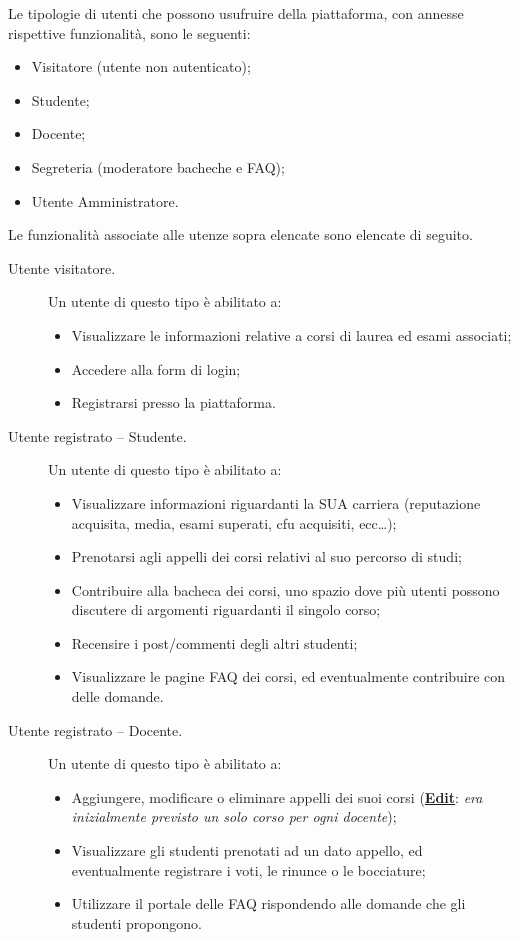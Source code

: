 \documentclass [a4paper,11pt]{book}
\begin{document}
Le tipologie di utenti che possono usufruire della piattaforma, con annesse rispettive funzionalità, sono le seguenti:
\begin{itemize}
\item Visitatore (utente non autenticato);
\item Studente;
\item Docente;
\item Segreteria (moderatore bacheche e FAQ);
\item Utente Amministratore.
\end{itemize}

\medskip
\medskip
\medskip

Le funzionalità associate alle utenze sopra elencate sono elencate di seguito.
\begin{description}
\item[Utente visitatore.] Un utente di questo tipo è abilitato a:

\begin{itemize}
\item Visualizzare le informazioni relative a corsi di laurea ed esami associati;
\item Accedere alla form di login;
\item Registrarsi presso la piattaforma.
\end{itemize}

\item[Utente registrato – Studente.] Un utente di questo tipo è abilitato a:

\begin{itemize}
\item Visualizzare informazioni riguardanti la SUA carriera (reputazione acquisita, media, esami superati, cfu acquisiti, ecc…);
\item Prenotarsi agli appelli dei corsi relativi al suo percorso di studi;
\item Contribuire alla bacheca dei corsi, uno spazio dove più utenti possono discutere di argomenti riguardanti il singolo corso;
\item Recensire i post/commenti degli altri studenti;
\item Visualizzare le pagine FAQ dei corsi, ed eventualmente contribuire con delle domande.
\end{itemize}

\item[Utente registrato – Docente.] Un utente di questo tipo è abilitato a:

\begin{itemize}
\item Aggiungere, modificare o eliminare appelli dei suoi corsi (\textbf{\underline{Edit}}: \emph{era inizialmente previsto un solo corso per ogni docente});
\item Visualizzare gli studenti prenotati ad un dato appello, ed eventualmente registrare i voti, le rinunce o le bocciature;
\item Utilizzare il portale delle FAQ rispondendo alle domande che gli studenti propongono.	
\end{itemize}


\end{description}
\end{document}
